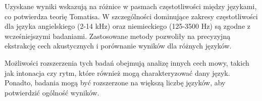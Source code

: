 Uzyskane wyniki wskazują na różnice w pasmach częstotliwości między językami, co potwierdza teorię Tomatisa. W szczególności dominujące zakresy częstotliwości dla języka angielskiego (2-14 kHz) oraz niemieckiego (125-3500 Hz) są zgodne z wcześniejszymi badaniami. Zastosowane metody pozwoliły na precyzyjną ekstrakcję cech akustycznych i porównanie wyników dla różnych języków.

Możliwości rozszerzenia tych badań obejmują analizę innych cech mowy, takich jak intonacja czy rytm, które również mogą charakteryzować dany język. Ponadto, badania mogą być rozszerzone na większą liczbę języków, aby potwierdzić ogólność wyników.
